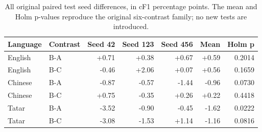 \begin{table}[htbp]
\centering\small
\setlength{\tabcolsep}{3pt}
\caption{All original paired test seed differences, in cF1 percentage points. The mean and Holm p-values reproduce the original six-contrast family; no new tests are introduced.}\label{tab:seedcontrasts}
\begin{tabular}{llrrrrr}
\toprule
Language & Contrast & Seed 42 & Seed 123 & Seed 456 & Mean & Holm p \\
\midrule
English & B-A & +0.71 & +0.38 & +0.67 & +0.59 & 0.2014 \\
English & B-C & -0.46 & +2.06 & +0.07 & +0.56 & 0.1659 \\
Chinese & B-A & -0.87 & -0.57 & -1.44 & -0.96 & 0.0730 \\
Chinese & B-C & +0.75 & -0.35 & +0.26 & +0.22 & 0.4418 \\
Tatar & B-A & -3.52 & -0.90 & -0.45 & -1.62 & 0.0222 \\
Tatar & B-C & -3.08 & -1.53 & +1.14 & -1.16 & 0.0816 \\
\bottomrule
\end{tabular}
\end{table}
